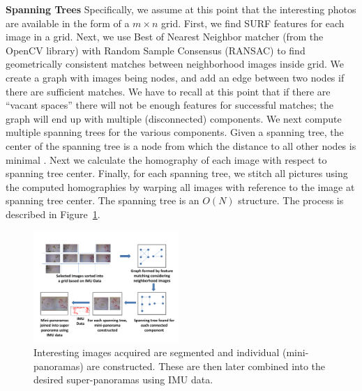 \documentclass[10pt,twocolumn,letterpaper]{article}
\begin{document}
{\bf Spanning Trees}
Specifically, we assume at this point that the interesting photos are
available in the form of a $m \times n$ grid. First, we find SURF
\cite{Bay} features for each image in a grid. Next, we use Best of
Nearest Neighbor matcher (from the OpenCV library) with Random Sample
Consensus (RANSAC) \cite{Fischler1981} to find geometrically
consistent matches between neighborhood images inside grid.  We
create a graph with images being nodes, and add an edge between two
nodes if there are sufficient matches. We have to recall at this point
that if there are ``vacant spaces'' there will not be enough features
for successful matches; the graph will end up with multiple
(disconnected) components.  We next compute multiple spanning trees
for the various components. Given a spanning tree, the center of the
spanning tree is a node from which the distance to all other nodes is
minimal \cite{Kocay}. Next we calculate the homography of each image with respect
to spanning tree center.  Finally, for each spanning tree, we stitch
all pictures using the computed homographies by warping all images
with reference to the image at spanning tree center. The spanning tree is
an $O(N)$ structure. The process is described in
Figure~\ref{fig:graph}.


\begin{figure}[h!]
  \centering
  \includegraphics[width=0.49\textwidth]{figures/graphCreation} 
  \caption{ \label{fig:graph} Interesting images acquired are
    segmented and individual (mini-panoramas) are constructed. These
    are then later combined into the desired super-panoramas using IMU data.}
\end{figure}    
\end{document}
